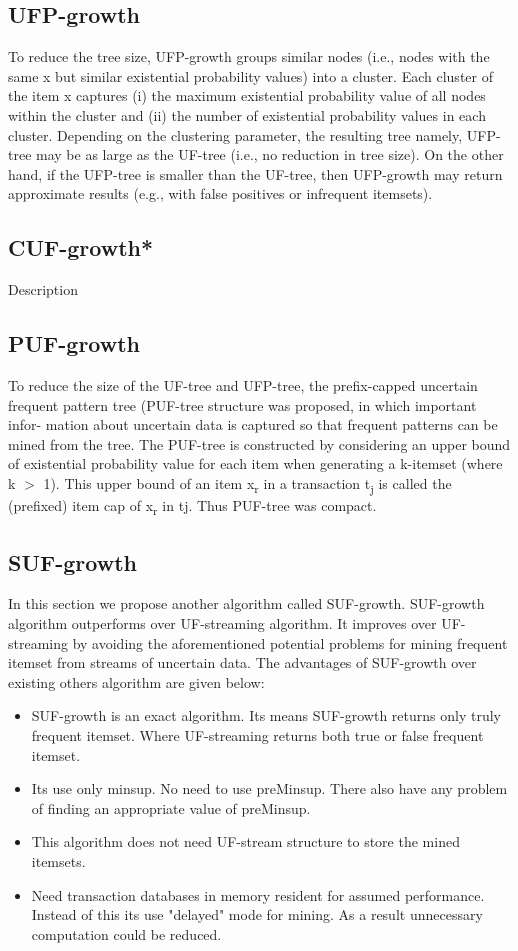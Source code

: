 \subsection{UFP-growth}
To reduce the tree size, UFP-growth groups similar nodes (i.e., nodes with the same x but similar existential probability values) into a cluster. Each cluster of the item x captures (i) the maximum existential probability value of all nodes within the cluster and (ii) the number of existential probability values in each cluster. Depending on the clustering parameter, the resulting tree namely, UFP-tree may be as large as the UF-tree (i.e., no reduction in tree size). On the other hand, if the UFP-tree  is smaller than the UF-tree, then UFP-growth may return approximate results (e.g., with false positives or infrequent itemsets).
\subsection{CUF-growth*}
Description
\subsection{PUF-growth}
To reduce the size of the UF-tree and UFP-tree, the preﬁx-capped uncertain frequent pattern tree (PUF-tree  structure was proposed, in which important infor- mation about uncertain data is captured so that frequent patterns can be mined from the tree. The PUF-tree  is constructed by considering an upper bound of existential probability value for each item when generating a k-itemset (where k $>$ 1). This upper bound of an item x\textsubscript{r} in a transaction t\textsubscript{j} is called the (preﬁxed) item cap of x\textsubscript{r} in tj. Thus PUF-tree was compact.
\subsection{SUF-growth}
In this section we propose another algorithm called SUF-growth. SUF-growth algorithm outperforms over UF-streaming algorithm. It improves over UF-streaming by avoiding the aforementioned potential problems for mining frequent itemset from streams of uncertain data. The advantages of SUF-growth over existing others algorithm are given below:
\begin{itemize}
 \item SUF-growth is an exact algorithm. Its means SUF-growth returns only truly frequent itemset. Where UF-streaming returns both true or false frequent itemset.
  \item Its use only minsup. No need to use preMinsup. There also have any problem of finding an appropriate value of preMinsup.
  \item This algorithm does not need UF-stream structure to store the mined itemsets.
  \item Need transaction databases in memory resident for assumed performance. Instead of this its use "delayed" mode for mining. As a result unnecessary computation could be reduced.
\end{itemize}
